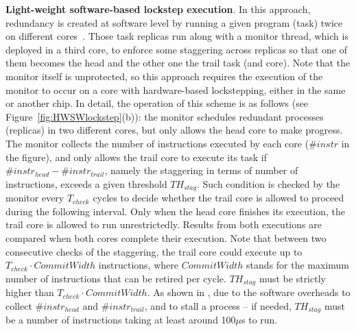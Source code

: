 \textbf{Light-weight software-based lockstep execution}. In this approach, redundancy is created at software level by running a given program (task) twice on different cores~\cite{SergiDFT}. Those task replicas run along with a monitor thread, which is deployed in a third core, to enforce some staggering across replicas so that one of them becomes the head and the other one the trail task (and core). Note that the monitor itself is unprotected, so this approach requires the execution of the monitor to occur on a core with hardware-based lockstepping, either in the same or another chip. 
In detail, the operation of this scheme is as follows (see Figure~\ref{fig:HWSWlockstep}(b)): the monitor schedules redundant processes (replicas) in two different cores, but only allows the head core to make progress. The monitor collects the number of instructions executed by each core ($\#instr$ in the figure), and only allows the trail core to execute its task if $\#instr_{head} - \#instr_{trail}$, namely the staggering in terms of number of instructions, exceeds a given threshold $TH_{stag}$. Such condition is checked by the monitor every $T_{check}$ cycles to decide whether the trail core is allowed to proceed during the following interval. Only when the head core finishes its execution, the trail core is allowed to run unrestrictedly. Results from both executions are compared when both cores complete their execution. 
Note that between two consecutive checks of the staggering, the trail core could execute up to $T_{check} \cdot CommitWidth$ instructions, where $CommitWidth$ stands for the maximum number of instructions that can be retired per cycle. $TH_{stag}$ must be strictly higher than $T_{check} \cdot CommitWidth$.
As shown in \cite{SergiDFT}, due to the software overheads to collect $\#instr_{head}$ and $\#instr_{trail}$, and to stall a process -- if needed, $TH_{stag}$ must be a number of instructions taking at least around 100$\mu$s to run.

